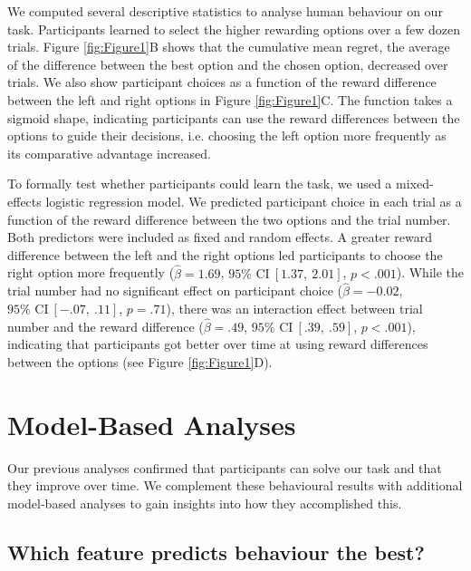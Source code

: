 \documentclass[10pt]{article}
\begin{document}
We computed several descriptive statistics to analyse human behaviour on our task. Participants learned to select the higher rewarding options over a few dozen trials. Figure \ref{fig:Figure1}B shows that the cumulative mean regret, the average of the difference between the best option and the chosen option, decreased over trials. We also show participant choices as a function of the reward difference between the left and right options in Figure \ref{fig:Figure1}C. The function takes a sigmoid shape, indicating participants can use the reward differences between the options to guide their decisions, i.e. choosing the left option more frequently as its comparative advantage increased.

To formally test whether participants could learn the task, we used a mixed-effects logistic regression model. We predicted participant choice in each trial as a function of the reward difference between the two options and the trial number. Both predictors were included as fixed and random effects. A greater reward difference between the left and the right options led participants to choose the right option more frequently ($\hat{\beta} = 1.69$, $95 \% \text{ CI} \:[1.37, \: 2.01]$, $p < .001$). While the trial number had no significant effect on participant choice ($\hat{\beta} = - 0.02$, $95 \% \text{ CI} \:[-.07, \: .11]$, $p = .71$), there was an interaction effect between trial number and the reward difference ($\hat{\beta} = .49$, $95 \% \text{ CI} \:[.39, \: .59]$, $p < .001$), indicating that participants got better over time at using reward differences between the options (see Figure \ref{fig:Figure1}D).


\section{Model-Based Analyses}



Our previous analyses confirmed that participants can solve our task and that they improve over time. We complement these behavioural results with additional model-based analyses to gain insights into how they accomplished this. 

\subsection{Which feature predicts behaviour the best?}
\end{document}
